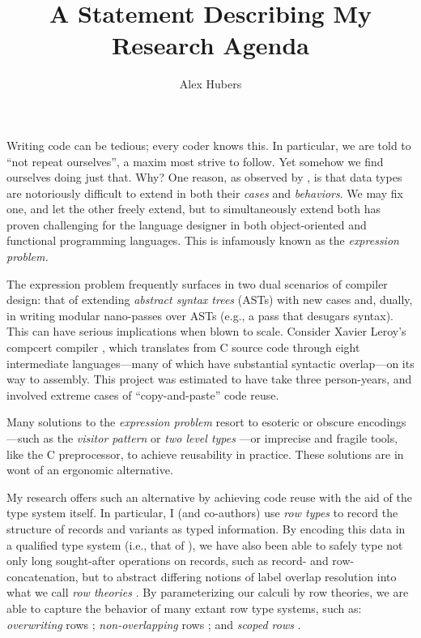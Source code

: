 \documentclass[open=any]{article}
\date{}
\title{A Statement Describing My Research Agenda}
\author{Alex Hubers}
\begin{document}
\maketitle

Writing code can be tedious; every coder knows this. In particular, we are told to ``not repeat ourselves'', a maxim most strive to follow. Yet somehow we find ourselves doing just that. Why? One reason, as observed by \citet{Wadler98}, is that data types are notoriously difficult to extend in both their \emph{cases} and \emph{behaviors}. We may fix one, and let the other freely extend, but to simultaneously extend both has proven challenging for the language designer in both object-oriented and functional programming languages. This is infamously known as the \emph{expression problem.}

The expression problem frequently surfaces in two dual scenarios of compiler design: that of extending \emph{abstract syntax trees} (ASTs) with new cases and, dually, in writing modular nano-passes over ASTs (e.g., a pass that desugars syntax). This can have serious implications when blown to scale. Consider Xavier Leroy's compcert compiler \cite{leroy09}, which translates from C source code through eight intermediate languages---many of which have substantial syntactic overlap---on its way to assembly. This project was estimated to have take three person-years, and involved extreme cases of ``copy-and-paste'' code reuse.

Many solutions to the \emph{expression problem} resort to esoteric or obscure encodings---such as the \emph{visitor pattern} or \emph{two level types} \cite{Sheard04}---or imprecise and fragile tools, like the C preprocessor, to achieve reusability in practice. These solutions are in wont of an ergonomic alternative.

My research offers such an alternative by achieving code reuse with the aid of the type system itself. In particular, I (and co-authors) use \emph{row types} \cite{Wand87,Remy89,Wand91} to record the structure of records and variants as typed information. By encoding this data in a qualified type system (i.e., that of \citet{Jones92}), we have also been able to safely type not only long sought-after operations on records, such as record- and row-concatenation, but to abstract differing notions of label overlap resolution into what we call \emph{row theories} \cite{MorrisM19}. By parameterizing our calculi by row theories, we are able to capture the behavior of many extant row type systems, such as: \emph{overwriting} rows \cite{Wand87}; \emph{non-overlapping} rows \cite{Remy89}; and \emph{scoped rows} \cite{Leijen05}.
\end{document}
